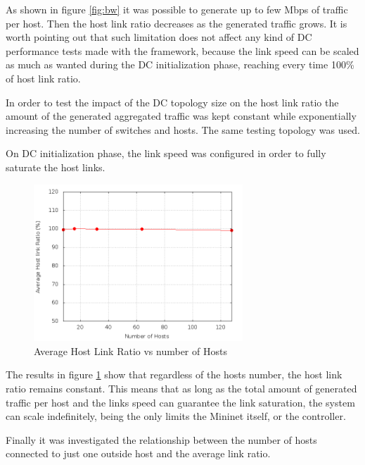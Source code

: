 \documentclass[12pt,english,oneside]{book}
\begin{document}
As shown in figure \ref{fig:bw} it was possible to generate up to few Mbps of traffic per host.
Then the host link ratio decreases as the generated traffic grows.
It is worth pointing out that such limitation does not affect any kind of DC performance tests made with the framework,
because the link speed can be scaled as much as wanted during the DC initialization phase, reaching every time 100\% of host link ratio.

In order to test the impact of the DC topology size on the
host link ratio the amount of the generated aggregated traffic was kept 
constant while exponentially increasing the number of switches and hosts.
The same testing topology was used.

On DC initialization phase, the link speed was configured in order to fully saturate the host links.

\begin{figure}[h!tbp]
        \centering
        \includegraphics[width=0.7\textwidth]{figures/topo.png}
        \caption{Average Host Link Ratio vs number of Hosts}
        \label{fig:topo}
\end{figure}

The results in figure \ref{fig:topo} show that regardless of the hosts number, the host link ratio remains constant.
This means that as long as the total amount of generated traffic per host and the links speed can guarantee the link saturation, the system can scale indefinitely, being the only limits the Mininet itself, or the controller.

Finally it was investigated the relationship between the number of hosts connected to just one outside host and the average link ratio.

\newpage
\end{document}
